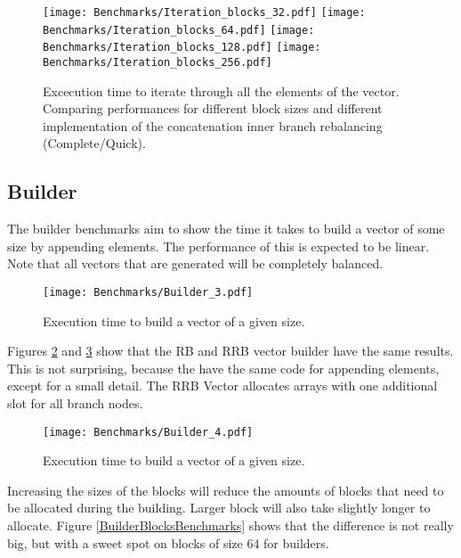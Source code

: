 \begin{figure}[h!]
  \centering
  \texttt{[image: Benchmarks/Iteration\_blocks\_32.pdf]}
  \texttt{[image: Benchmarks/Iteration\_blocks\_64.pdf]}
  \texttt{[image: Benchmarks/Iteration\_blocks\_128.pdf]}
  \texttt{[image: Benchmarks/Iteration\_blocks\_256.pdf]}
  \caption{Excecution time to iterate through all the elements of the vector. Comparing performances for different block sizes and different implementation of the concatenation inner branch rebalancing (Complete/Quick).}
  \label{IterationBlocksBenchmarks}
\end{figure}

\FloatBarrier

\subsection{Builder}
The builder benchmarks aim to show the time it takes to build a vector of some size by appending elements. The performance of this is expected to be linear. Note that all vectors that are generated will be completely balanced.


\begin{figure}[h!]
  \centering
  \texttt{[image: Benchmarks/Builder\_3.pdf]}
  \caption{Execution time to build a vector of a given size.}
    \label{Builder3Benchmarks}
\end{figure}

Figures \ref{Builder3Benchmarks} and \ref{Builder4Benchmarks} show that the RB and RRB vector builder have the same results. This is not surprising, because the have the same code for appending elements, except for a small detail. The RRB Vector allocates arrays with one additional slot for all branch nodes.

\begin{figure}[h!]
  \centering
  \texttt{[image: Benchmarks/Builder\_4.pdf]}
  \caption{Execution time to build a vector of a given size.}
   \label{Builder4Benchmarks}
\end{figure}

\FloatBarrier

Increasing the sizes of the blocks will reduce the amounts of blocks that need to be allocated during the building. Larger block will also take slightly longer to allocate. Figure \ref{BuilderBlocksBenchmarks} shows that the difference is not really big, but with a sweet spot on blocks of size 64 for builders.

